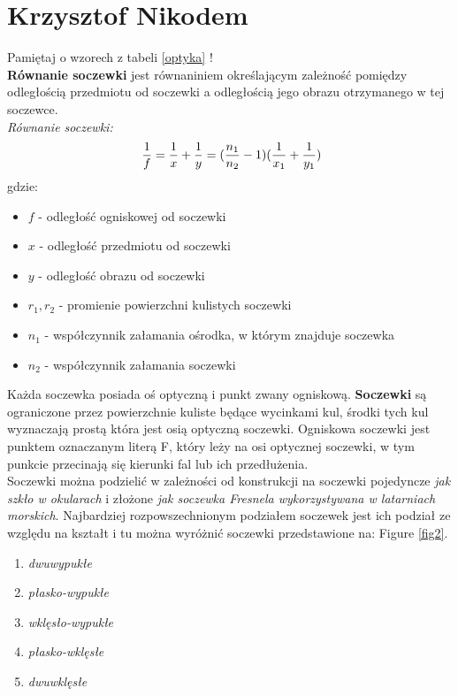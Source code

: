 
\section{Krzysztof Nikodem}

Pamiętaj o wzorech z tabeli \ref{optyka} ! \\

\textbf{Równanie soczewki} jest równaniniem określającym zależność pomiędzy odległością przedmiotu od soczewki a odległością jego obrazu otrzymanego w tej soczewce.\\

\emph{Równanie soczewki:}
\begin{equation}\label{eq1}
\ \frac{1}{f}=\frac{1}{x}+\frac{1}{y}=(\frac{n_1}{n_2}-1)(\frac{1}{x_1}+\frac{1}{y_1})\\   
\end{equation}
gdzie:
\begin{itemize}
    \item $f$ - odległość ogniskowej od soczewki
    \item $x$ - odległość przedmiotu od soczewki
    \item $y$ - odległość obrazu od soczewki
    \item $r_1,r_2$ - promienie powierzchni kulistych soczewki
    \item $n_1$ - współczynnik załamania ośrodka, w którym znajduje soczewka
    \item $n_2$ - współczynnik załamania soczewki 
\end{itemize}

Każda soczewka posiada oś optyczną i punkt zwany ogniskową. \textbf{Soczewki}  są ograniczone przez powierzchnie kuliste będące wycinkami kul, środki tych kul wyznaczają prostą która jest osią optyczną soczewki. Ogniskowa soczewki jest punktem oznaczanym literą F, który leży na osi optycznej soczewki, w tym punkcie przecinają się kierunki fal lub ich przedłużenia.\\

Soczewki można podzielić w zależności od konstrukcji na soczewki pojedyncze \emph{jak szkło w okularach} i złożone \emph{jak soczewka Fresnela wykorzystywana w latarniach morskich}. Najbardziej rozpowszechnionym podziałem soczewek jest ich podział ze względu na kształt i tu można wyróżnić soczewki przedstawione na: Figure \ref{fig2}.\\

\begin{enumerate}
    \centering
    \item  \emph{dwuwypukłe}
    \item  \emph{płasko-wypukłe}
    \item  \emph{wklęsło-wypukłe}
    \item  \emph{płasko-wklęsłe}
    \item  \emph{dwuwklęsłe}
    
\end{enumerate}

